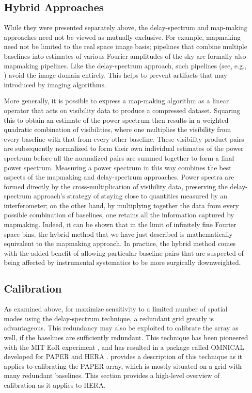 \documentclass[preprint,11pt]{aastex}
\begin{document}
\subsection{Hybrid Approaches}
\label{sec:hybridapproach}

While they were presented separately above, the delay-spectrum and map-making approaches need not be viewed as mutually exclusive. For example, mapmaking need not be limited to the real space image basis; pipelines that combine multiple baselines into estimates of various Fourier amplitudes of the sky are formally also mapmaking pipelines. Like the delay-spectrum approach, such pipelines (see, e.g., \citealt{trott_et_al2016}) avoid the image domain entirely. This helps to prevent artifacts that may introduced by imaging algorithms.

More generally, it is possible to express a map-making algorithm as a linear operator that acts on visibility data to produce a compressed dataset. Squaring this to obtain an estimate of the power spectrum then results in a weighted quadratic combination of visibilities, where one multiplies the visibility from every baseline with that from every other baseline. These visibility product pairs are subsequently normalized to form their own individual estimates of the power spectrum before all the normalized pairs are summed together to form a final power spectrum. Measuring a power spectrum in this way combines the best aspects of the mapmaking and delay-spectrum approaches. Power spectra are formed directly by the cross-multiplication of visibility data, preserving the delay-spectrum approach's strategy of staying close to quantities measured by an interferometer; on the other hand, by multiplying together the data from every possible combination of baselines, one retains all the information captured by mapmaking. Indeed, it can be shown \citep{liu_et_al2014a} that in the limit of infinitely fine Fourier space bins, the hybrid method that we have just described is mathematically equivalent to the mapmaking approach. In practice, the hybrid method comes with the added benefit of allowing particular baseline pairs that are suspected of being affected by instrumental systematics to be more surgically downweighted.

\subsection{Calibration}
\label{sec:calibration}
As examined above, for maximize sensitivity to a limited number of spatial modes using the delay-spectrum technique, a redundant grid greatly is advantageous.  This redundancy may also be exploited to calibrate the array as well, if the baselines are sufficiently redundant.  This technique has been pioneered with the MIT EoR experiment \citep{zheng_et_al2014}, and has resulted in a package called OMNICAL developed for PAPER and HERA .  \cite{ali_et_al2015} provides a description of this technique as it applies to calibrating the PAPER array, which is mostly situated on a grid with many redundant baselines.  This section provides a high-level overview of calibration as it applies to HERA.
\end{document}
